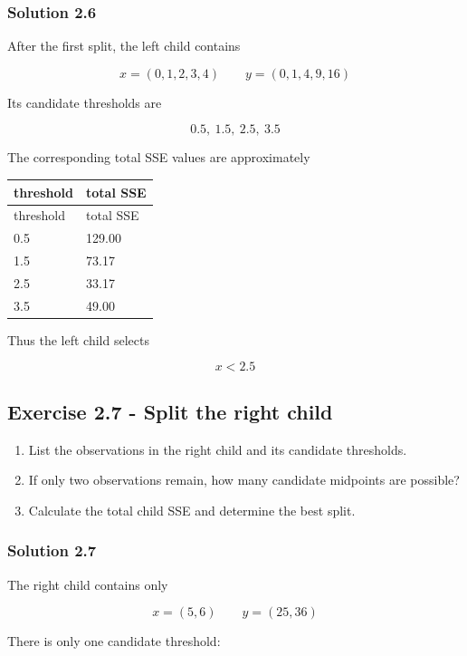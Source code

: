 \documentclass[10pt]{article}
\begin{document}
\subsubsection*{Solution 2.6}
After the first split, the left child contains

\[
x=(0,1,2,3,4)
\qquad
y=(0,1,4,9,16)
\]

Its candidate thresholds are

\[
0.5,\ 1.5,\ 2.5,\ 3.5
\]

The corresponding total SSE values are approximately

\begingroup
\small
\setlength{\tabcolsep}{4pt}
\begin{longtable}{l|l}
threshold & total SSE \\
\hline
\endfirsthead
threshold & total SSE \\
\hline
\endhead
0.5 & 129.00 \\[1.5pt]
1.5 & 73.17 \\[1.5pt]
2.5 & 33.17 \\[1.5pt]
3.5 & 49.00 \\[1.5pt]
\end{longtable}
\endgroup
Thus the left child selects

\[
x<2.5
\]

\par\endgroup

\subsection*{Exercise 2.7 - Split the right child}
\begin{enumerate}
\item
List the observations in the right child and its candidate thresholds.

\item
If only two observations remain, how many candidate midpoints are possible?

\item
Calculate the total child SSE and determine the best split.

\end{enumerate}
\begingroup\color{red}

\subsubsection*{Solution 2.7}
The right child contains only

\[
x=(5,6)
\qquad
y=(25,36)
\]

There is only one candidate threshold:
\end{document}
